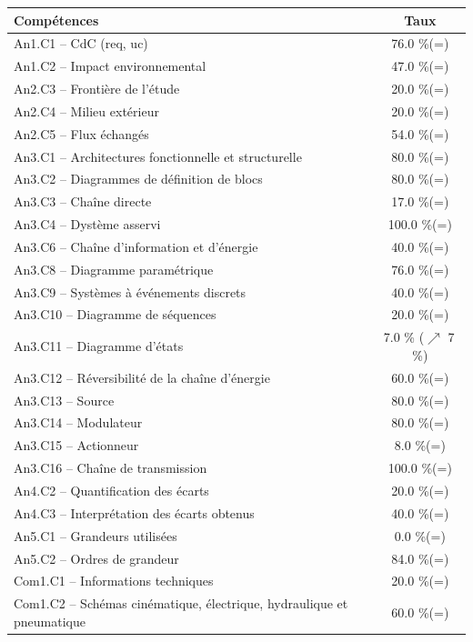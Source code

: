 \footnotesize 
\begin{center} 
\begin{tabular}{|p{.7\linewidth}|c|} 
\hline 
Compétences  & Taux \\ \hline \hline 
An1.C1 -- CdC (req, uc)&76.0 \%(=)\\ \hline 
An1.C2 -- Impact environnemental&47.0 \%(=)\\ \hline 
An2.C3 -- Frontière de l’étude&20.0 \%(=)\\ \hline 
An2.C4 -- Milieu extérieur&20.0 \%(=)\\ \hline 
An2.C5 -- Flux échangés&54.0 \%(=)\\ \hline 
An3.C1 -- Architectures fonctionnelle et structurelle&80.0 \%(=)\\ \hline 
An3.C2 -- Diagrammes de définition de blocs&80.0 \%(=)\\ \hline 
An3.C3 -- Chaîne directe&17.0 \%(=)\\ \hline 
An3.C4 -- Dystème asservi&100.0 \%(=)\\ \hline 
An3.C6 -- Chaîne d’information et d'énergie&40.0 \%(=)\\ \hline 
An3.C8 -- Diagramme paramétrique&76.0 \%(=)\\ \hline 
An3.C9 -- Systèmes à événements discrets&40.0 \%(=)\\ \hline 
An3.C10 -- Diagramme de séquences&20.0 \%(=)\\ \hline 
An3.C11 -- Diagramme d’états&7.0 \% ($\nearrow$ 7\,\%)\\ \hline 
An3.C12 -- Réversibilité de la chaîne d’énergie&60.0 \%(=)\\ \hline 
An3.C13 -- Source&80.0 \%(=)\\ \hline 
An3.C14 -- Modulateur&80.0 \%(=)\\ \hline 
An3.C15 -- Actionneur&8.0 \%(=)\\ \hline 
An3.C16 -- Chaîne de transmission&100.0 \%(=)\\ \hline 
An4.C2 -- Quantification des écarts&20.0 \%(=)\\ \hline 
An4.C3 -- Interprétation des écarts obtenus&40.0 \%(=)\\ \hline 
An5.C1 -- Grandeurs utilisées &0.0 \%(=)\\ \hline 
An5.C2 -- Ordres de grandeur&84.0 \%(=)\\ \hline 
Com1.C1 -- Informations techniques&20.0 \%(=)\\ \hline 
Com1.C2 -- Schémas cinématique, électrique, hydraulique et pneumatique&60.0 \%(=)\\ \hline 

\end{tabular}
\end{center}
